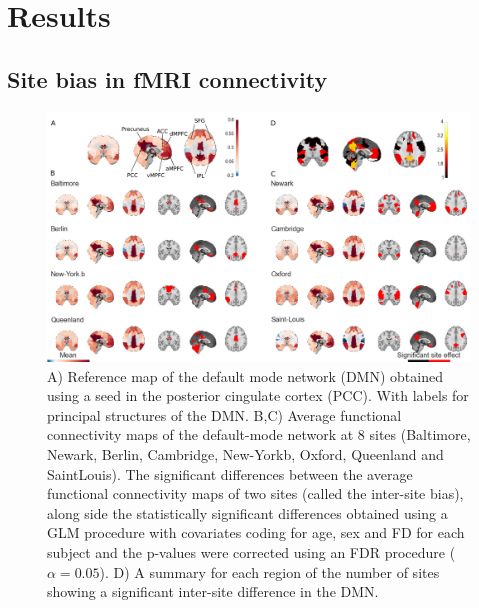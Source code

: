 \documentclass[authoryear]{elsarticle}
\begin{document}
\section{Results}

\subsection{Site bias in fMRI connectivity}


\begin{figure}[tbp]
\begin{center}
\includegraphics[width=\linewidth]{../figures/dmn_multisite.png}
\end{center}
\caption[DMN variability across sites]{
A) Reference map of the default mode network (DMN) obtained using a seed in the posterior cingulate cortex (PCC). With labels for principal structures of the DMN.
B,C) Average functional connectivity maps of the default-mode network at 8 sites (Baltimore, Newark, Berlin, Cambridge, New-Yorkb, Oxford, Queenland and SaintLouis). The significant differences between the average functional connectivity maps of two sites (called the inter-site bias), along side the statistically significant  differences obtained using a GLM procedure with covariates coding for age, sex and FD for each subject and the p-values were corrected using an FDR procedure ($\alpha=0.05$).
D) A summary for each region of the number of sites showing a significant inter-site difference in the DMN.
}
\label{fig_DMN_variability}
\end{figure}
\end{document}
